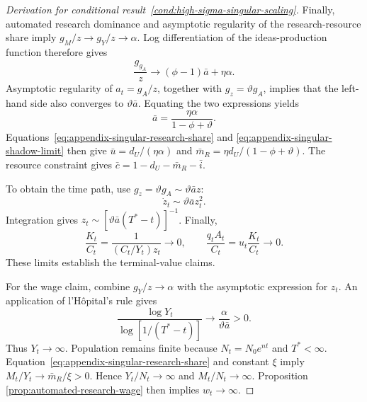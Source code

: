 \begin{proof}[Derivation for conditional result~\ref{cond:high-sigma-singular-scaling}]
Finally, automated research dominance and asymptotic regularity of the
research-resource share imply
$g_M/z\to g_Y/z\to\alpha$. Log differentiation of the ideas-production function
therefore gives
\[
    \frac{g_{g_A}}{z}
    \longrightarrow
    (\phi-1)\bar a+\eta\alpha.
\]
Asymptotic regularity of $a_t=g_A/z$, together with
$g_z=\vartheta g_A$, implies that the left-hand side also converges to
$\vartheta\bar a$. Equating the two expressions yields
\[
    \bar a
    =
    \frac{\eta\alpha}{1-\phi+\vartheta}.
\]
Equations~\eqref{eq:appendix-singular-research-share} and
\eqref{eq:appendix-singular-shadow-limit} then give
$\bar u=d_U/(\eta\alpha)$ and
$\bar m_R=\eta d_U/(1-\phi+\vartheta)$. The resource constraint gives
$\bar c=1-d_U-\bar m_R-\bar i$.

To obtain the time path, use $g_z=\vartheta g_A\sim\vartheta\bar a z$:
\[
    \dot z_t
    \sim
    \vartheta\bar a z_t^2.
\]
Integration gives
$z_t\sim[\vartheta\bar a(T^*-t)]^{-1}$. Finally,
\[
    \frac{K_t}{C_t}
    =
    \frac{1}{(C_t/Y_t)z_t}
    \longrightarrow0,
    \qquad
    \frac{q_tA_t}{C_t}
    =
    u_t\frac{K_t}{C_t}
    \longrightarrow0.
\]
These limits establish the terminal-value claims.

For the wage claim, combine $g_Y/z\to\alpha$ with the asymptotic expression for
$z_t$. An application of l'H\^opital's rule gives
\[
    \frac{\log Y_t}{\log[1/(T^*-t)]}
    \longrightarrow
    \frac{\alpha}{\vartheta\bar a}>0.
\]
Thus $Y_t\to\infty$. Population remains finite because
$N_t=N_0e^{nt}$ and $T^*<\infty$. Equation~\eqref{eq:appendix-singular-research-share}
and constant $\xi$ imply $M_t/Y_t\to\bar m_R/\xi>0$. Hence
$Y_t/N_t\to\infty$ and $M_t/N_t\to\infty$. Proposition
\ref{prop:automated-research-wage} then implies $w_t\to\infty$.
\end{proof}

